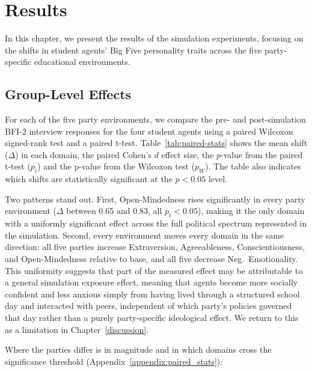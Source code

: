 \chapter{Results}
\label{results}

In this chapter, we present the results of the simulation experiments, focusing on the shifts in student agents' Big Five personality traits across the five party-specific educational environments.

\section{Group-Level Effects} \label{sec:group-level}

For each of the five party environments, we compare the pre- and post-simulation BFI-2 interview responses for the four student agents using a paired Wilcoxon signed-rank test and a paired t-test. Table~\ref{tab:paired-stats} shows the mean shift ($\Delta$) in each domain, the paired Cohen's $d$ effect size, the $p$-value from the paired t-test ($p_t$) and the p-value from the Wilcoxon test ($p_W$). The table also indicates which shifts are statistically significant at the $p<0.05$ level.

Two patterns stand out. First, Open-Mindedness rises significantly in every party environment ($\Delta$ between 0.65 and 0.83, all $p_t<0.05$), making it the only domain with a uniformly significant effect across the full political spectrum represented in the simulation. Second, every environment moves every domain in the same direction: all five parties increase Extraversion, Agreeableness, Conscientiousness, and Open-Mindedness relative to base, and all five decrease Neg.\ Emotionality. This uniformity suggests that part of the measured effect may be attributable to a general simulation exposure effect, meaning that agents become more socially confident and less anxious simply from having lived through a structured school day and interacted with peers, independent of which party's policies governed that day rather than a purely party-specific ideological effect. We return to this as a limitation in Chapter~\ref{discussion}.

Where the parties differ is in magnitude and in which domains cross the significance threshold (Appendix~\ref{appendix:paired_stats}):

